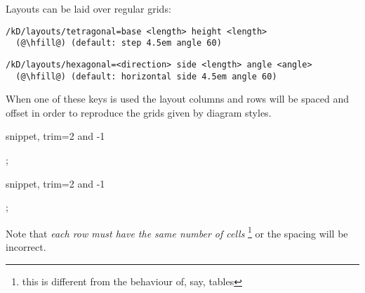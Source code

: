 Layouts can be laid over regular grids:

\begin{lstlisting}
/kD/layouts/tetragonal=base <length> height <length>
  (@\hfill@) (default: step 4.5em angle 60)
\end{lstlisting}

\begin{lstlisting}
/kD/layouts/hexagonal=<direction> side <length> angle <angle>
  (@\hfill@) (default: horizontal side 4.5em angle 60)
\end{lstlisting}

When one of these keys is used the layout columns and rows will be
spaced and offset in order to reproduce the grids given by diagram styles.

\begin{tcblisting}{snippet, trim={2 and -1}}
\begin{kodi}
  ;
\end{kodi}
\end{tcblisting}

\begin{tcblisting}{snippet, trim={2 and -1}}
\begin{kodi}
  ;
\end{kodi}
\end{tcblisting}

Note that \emph{each row must have the same number of cells}%
\footnote{this is different from the behaviour of, say, tables}
or the spacing will be incorrect.
